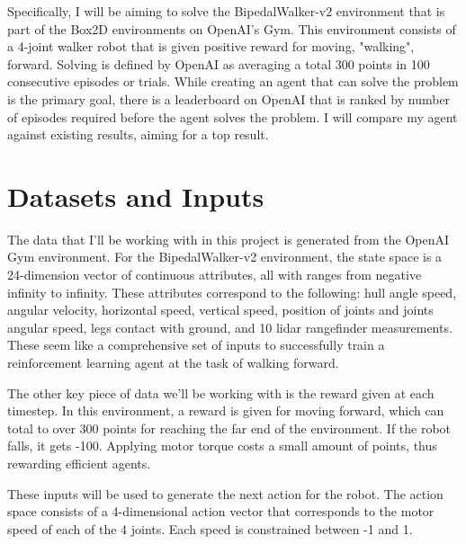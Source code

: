 \documentclass{article}
\begin{document}
\begin{figure}[h]
\end{figure}

Specifically, I will be aiming to solve the BipedalWalker-v2 environment that is part of the Box2D environments on OpenAI's Gym. This environment consists of a 4-joint walker robot that is given positive reward for moving, "walking", forward. Solving is defined by OpenAI as averaging a total 300 points in 100 consecutive episodes or trials. While creating an agent that can solve the problem is the primary goal, there is a leaderboard on OpenAI that is ranked by number of episodes required before the agent solves the problem. I will compare my agent against existing results, aiming for a top result.

\section{Datasets and Inputs}
\label{sec:datasets}
The data that I'll be working with in this project is generated from the OpenAI Gym environment. For the BipedalWalker-v2 environment, the state space is a 24-dimension vector of continuous attributes, all with ranges from negative infinity to infinity. These attributes correspond to the following: hull angle speed, angular velocity, horizontal speed, vertical speed, position of joints and joints angular speed, legs contact with ground, and 10 lidar rangefinder measurements. These seem like a comprehensive set of inputs to successfully train a reinforcement learning agent at the task of walking forward.  

The other key piece of data we'll be working with is the reward given at each timestep. In this environment, a reward is given for moving forward, which can total to over 300 points for reaching the far end of the environment. If the robot falls, it gets -100. Applying motor torque costs a small amount of points, thus rewarding efficient agents.

These inputs will be used to generate the next action for the robot. The action space consists of a 4-dimensional action vector that corresponds to the motor speed of each of the 4 joints. Each speed is constrained between -1 and 1. 
\end{document}
